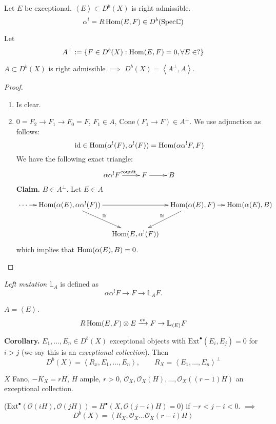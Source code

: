 \begin{exercise}
\label{exercise-right-admissible}
Let $E$ be exceptional. $\left<E\right>\subset D^b(X)$ is right admissible.
$$
\alpha^!=R \mathop{\mathrm{Hom}}\nolimits(E,F) \in D^b(\text{Spec} \mathbb{C})
$$
\end{exercise}

Let
$$
A^\perp:=\{F \in D^b(X):\mathop{\mathrm{Hom}}\nolimits(E,F)=0, \forall E \in ?\}
$$
\begin{lemma}
\label{lemma-right-admissible}
$A \subset D^b(X)$ is right admissible $\implies$
$D^b(X)=\left<A^\perp,A\right>$.
\end{lemma}

\begin{proof}
\begin{enumerate}
\item Is clear.
\item $0=F_2 \to F_1 \to F_0=F$, $F_1 \in A$, $\text{Cone}(F_1 \to F) \in
A^\perp$. We use adjunction as follows:
$$
\text{id} \in \mathop{\mathrm{Hom}}\nolimits(\alpha^!(F),\alpha^!(F))=\mathop{\mathrm{Hom}}\nolimits(\alpha \alpha^!F,F)
$$
We have the following exact triangle:
$$
\xymatrix{
\alpha \alpha^!F\ar[r]^{\text{counit}}&  F\ar[r]& B
}
$$
{\bf Claim.} $B \in A^\perp$. Let $E \in A$ 
$$
\xymatrixcolsep{1em}
\xymatrix{
\cdots\ar[r]&\Hom(\alpha(E),\alpha \alpha^!(F))\ar[dr]^{\cong}\ar[rr]&&
\Hom(\alpha(E),F)\ar[dl]_{\cong}\ar[r]&\Hom(\alpha(E),B)\\
& & \Hom(E,\alpha^!(F))
}
$$
which implies that $\mathop{\mathrm{Hom}}\nolimits(\alpha(E),B)=0$.

\end{enumerate}
\end{proof}

\begin{definition}
\label{definition-left-mutation}
{\it Left mutation} $\mathbb{L}_A$ is defined as
$$
\alpha \alpha^!F \to F \to \mathbb{L}_AF.
$$
\end{definition}

\begin{exercise}
\label{exercise-left-mutation}
$A=\left<E\right>$.
$$
R \mathop{\mathrm{Hom}}\nolimits(E,F)\otimes E \xrightarrow{\text{ev}}F \to \mathbb{L}_{\left<E\right>}F
$$
\end{exercise}

{\bf Corollary.} $E_1,\ldots,E_n \in D^b(X)$ exceptional objects with
$\text{Ext}^\bullet(E_i,E_j)=0$ for $i>j$ (we say this is an  {\it exceptional
collection}). Then
$$
D^b(X)=\left<R_x,E_1,\ldots,E_n\right>,\qquad 
R_X=\left<E_1,\ldots,E_n\right>^\perp
$$

\begin{example}
\label{example-Fano}
$X$ Fano, $-K_X=rH$, $H$ ample, $r>0$,
 $\mathcal{O}_X,\mathcal{O}_X(H),\ldots,\mathcal{O}_X((r-1)H)$
an exceptional collection.

($\text{Ext}^\bullet(\mathcal{O}(iH),\mathcal{O}(jH))=
H^{\bullet}(X,\mathcal{O}(j-i)H)=0$) if $-r<j-i<0$. $\implies$
$$
D^b(X)=\left<R_X,\mathcal{O}_X\ldots\mathcal{O}_X(r-i)H\right>
$$
\end{example}

